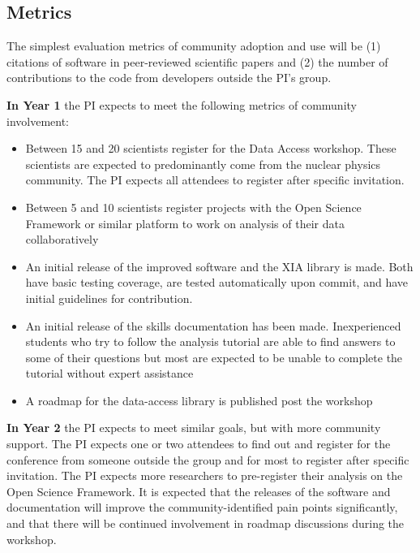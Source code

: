 \subsection{Metrics}
The simplest evaluation metrics of community adoption and use will be (1) citations of software in peer-reviewed scientific papers and (2) the number of contributions to the code from developers outside the PI's group.

\textbf{In Year 1}  the PI expects to meet the following metrics of community involvement:
\begin{itemize}
  \item Between 15 and 20 scientists register for the Data Access workshop.  These scientists are expected to predominantly come from the nuclear physics community.  The PI expects all attendees to register after specific invitation.
  \item Between 5 and 10 scientists register projects with the Open Science Framework or similar platform to work on analysis of their data collaboratively
  \item An initial release of the improved software and the XIA library is made.  Both have basic testing coverage, are tested automatically upon commit, and have initial guidelines for contribution.
  \item An initial release of the skills documentation has been made.  Inexperienced students who try to follow the analysis tutorial are able to find answers to some of their questions but most are expected to be unable to complete the tutorial without expert assistance
  \item A roadmap for the data-access  library is published post the workshop
\end{itemize}

\textbf{In Year 2}
the PI expects to meet similar goals, but with more community support.  The PI expects one or two attendees to find out and register for the conference from someone outside the group and for most to register after specific invitation.  The PI expects more researchers to pre-register their analysis on the Open Science Framework.  It is expected that the releases of the software and documentation will improve the community-identified pain points significantly, and that there will be continued involvement in roadmap discussions during the workshop.

